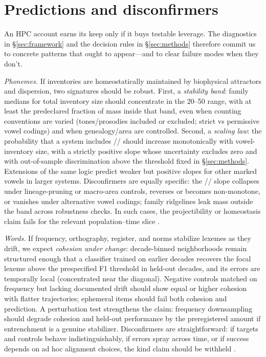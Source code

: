 \documentclass[12pt]{article}
\begin{document}
\section{Predictions and disconfirmers}\label{sec:predictions}

An \textsc{HPC} account earns its keep only if it buys testable leverage. The diagnostics in \S\ref{sec:framework} and the decision rules in \S\ref{sec:methods} therefore commit us to concrete patterns that ought to appear—and to clear failure modes when they don't.

\emph{Phonemes.} If inventories are homeostatically maintained by biophysical attractors and dispersion, two signatures should be robust. First, a \emph{stability band}: family medians for total inventory size should concentrate in the 20–50 range, with at least the predeclared fraction of mass inside that band, even when counting conventions are varied (tones/prosodies included or excluded; strict vs permissive vowel codings) and when genealogy/area are controlled. Second, a \emph{scaling law}: the probability that a system includes // should increase monotonically with vowel-inventory size, with a strictly positive slope whose uncertainty excludes zero and with out-of-sample discrimination above the threshold fixed in \S\ref{sec:methods}. Extensions of the same logic predict weaker but positive slopes for other marked vowels in larger systems. Disconfirmers are equally specific: the // slope collapses under lineage-pruning or macro-area controls, reverses or becomes non-monotone, or vanishes under alternative vowel codings; family ridgelines leak mass outside the band across robustness checks. In such cases, the projectibility or homeostasis claim fails for the relevant population–time slice \citep{Ekstrom2025PhonemeTool,Stevens1989Quantal,LiljencrantsLindblom1972,Lindblom1990HandH}.

\emph{Words.} If frequency, orthography, register, and norms stabilize lexemes as they drift, we expect \emph{cohesion under change}: decade-binned neighborhoods remain structured enough that a classifier trained on earlier decades recovers the focal lexeme above the prespecified F1 threshold in held-out decades, and its errors are temporally local (concentrated near the diagonal). Negative controls matched on frequency but lacking documented drift should show equal or higher cohesion with flatter trajectories; ephemeral items should fail both cohesion and prediction. A perturbation test strengthens the claim: frequency downsampling should degrade cohesion and held-out performance by the preregistered amount if entrenchment is a genuine stabilizer. Disconfirmers are straightforward: if targets and controls behave indistinguishably, if errors spray across time, or if success depends on ad hoc alignment choices, the kind claim should be withheld \citep{Miller2021WordsSpeciesKinds,HamiltonEtAl2016}.
\end{document}
